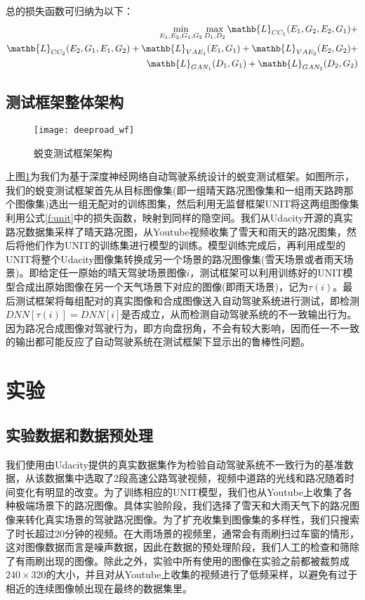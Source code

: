 总的损失函数可归纳为以下：
\begin{equation}
\begin{aligned}
    \min_{E_1,E_2,G_1,G_2}\max_{D_1,D_2}\mathb{L}_{CC_1}(E_1,G_2,E_2,G_1)+ \\ 
    \mathb{L}_{CC_2}(E_2,G_1,E_1,G_2) + \mathb{L}_{VAE_1}(E_1,G_1)+\mathb{L}_{VAE_2}(E_2,G_2)+ \\
    \mathb{L}_{GAN_1}(D_1,G_1) + \mathb{L}_{GAN_2}(D_2,G_2)
    \label{f:unit}
\end{aligned}
\end{equation}

\subsection{测试框架整体架构}

\begin{figure}[h]
    \centering
    \texttt{[image: deeproad\_wf]}
    \caption{蜕变测试框架架构}
    \label{dp-wf}
\end{figure}

上图\ref{dp-wf}为我们为基于深度神经网络自动驾驶系统设计的蜕变测试框架。如图所示，我们的蜕变测试框架首先从目标图像集(即一组晴天路况图像集和一组雨天路跨那个图像集)选出一组无配对的训练图集，然后利用无监督框架UNIT将这两组图像集利用公式\ref{f:unit}中的损失函数，映射到同样的隐空间。我们从Udacity开源的真实路况数据集\cite{udacity_dataset}采样了晴天路况图，从Youtube视频收集了雪天和雨天的路况图集，然后将他们作为UNIT的训练集进行模型的训练。模型训练完成后，再利用成型的UNIT将整个Udacity图像集转换成另一个场景的路况图像集(雪天场景或者雨天场景)。即给定任一原始的晴天驾驶场景图像$i$，测试框架可以利用训练好的UNIT模型合成出原始图像在另一个天气场景下对应的图像(即雨天场景)，记为$\tau(i)$。最后测试框架将每组配对的真实图像和合成图像送入自动驾驶系统进行测试，即检测$DNN[\tau(i)]=DNN[i]$是否成立，从而检测自动驾驶系统的不一致输出行为。因为路况合成图像对驾驶行为，即方向盘拐角，不会有较大影响，因而任一不一致的输出都可能反应了自动驾驶系统在测试框架下显示出的鲁棒性问题。

\section{实验}

\subsection{实验数据和数据预处理}

我们使用由Udacity提供的真实数据集作为检验自动驾驶系统不一致行为的基准数据，从该数据集中选取了2段高速公路驾驶视频，视频中道路的光线和路况随着时间变化有明显的改变。为了训练相应的UNIT模型，我们也从Youtube上收集了各种极端场景下的路况图像。具体实验阶段，我们选择了雪天和大雨天气下的路况图像来转化真实场景的驾驶路况图像。为了扩充收集到图像集的多样性，我们只搜索了时长超过20分钟的视频。在大雨场景的视频里，通常会有雨刷扫过车窗的情形，这对图像数据而言是噪声数据，因此在数据的预处理阶段，我们人工的检查和筛除了有雨刷出现的图像。除此之外，实验中所有使用的图像在实验之前都被裁剪成$240\times 320$的大小，并且对从Youtube上收集的视频进行了低频采样，以避免有过于相近的连续图像帧出现在最终的数据集里。

